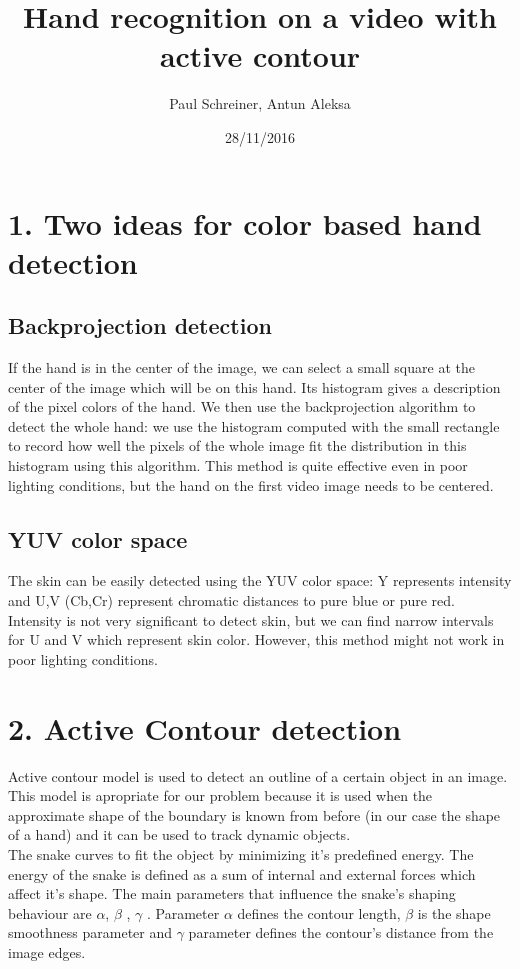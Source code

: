\documentclass{report}
\title{Hand recognition on a video with active contour}
\author{Paul Schreiner, Antun Aleksa}
\date{28/11/2016}
\begin{document}
\maketitle



\section*{1. Two ideas for color based hand detection}

\subsection*{Backprojection detection}

If the hand is in the center of the image, we can select a small square at the center of the image which will be on this hand. Its histogram gives a description of the pixel colors of the hand. We then use the backprojection algorithm to detect the whole hand: we use the histogram computed with the small rectangle to record how well the pixels of the whole image fit the distribution in this histogram using this algorithm. This method is quite effective even in poor lighting conditions, but the hand on the first video image needs to be centered. 

\subsection*{YUV color space}

The skin can be easily detected using the YUV color space: Y represents intensity and U,V (Cb,Cr) represent chromatic distances to pure blue or pure red. Intensity is not very significant to detect skin, but we can find narrow intervals for U and V which represent skin color. However, this method might not work in poor lighting conditions. 



\section*{2. Active Contour detection}

Active contour model is used to detect an outline of a certain object in an image. This model is apropriate for our problem because it is used when the approximate shape of the boundary is known from before (in our case the shape of a hand) and it can be used to track dynamic objects. \\
The snake curves to fit the object by minimizing it's predefined energy. The energy of the snake is defined as a sum of internal and external forces which affect it's shape. The main parameters that influence the snake's shaping behaviour are $\alpha$, $\beta$ , $\gamma$ . Parameter $\alpha$ defines the contour length, $\beta$ is the shape smoothness parameter and $\gamma$ parameter defines the contour's distance from the image edges.
\end{document}
